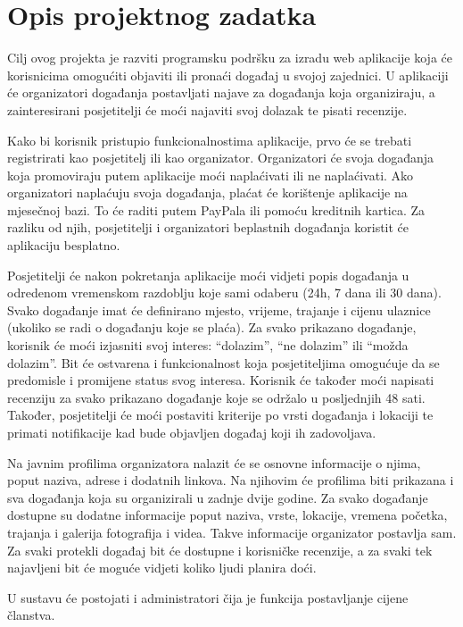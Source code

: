 \chapter{Opis projektnog zadatka}
		
		\large Cilj ovog projekta je razviti programsku podršku za izradu web
aplikacije koja će korisnicima omogućiti objaviti ili pronaći događaj
u svojoj zajednici. U aplikaciji će organizatori događanja postavljati
najave za događanja koja organiziraju, a zainteresirani posjetitelji će
moći najaviti svoj dolazak te pisati recenzije. 

Kako bi korisnik pristupio funkcionalnostima aplikacije, prvo će se trebati registrirati kao posjetitelj ili kao organizator. Organizatori će svoja događanja koja promoviraju putem aplikacije moći naplaćivati ili ne naplaćivati. Ako organizatori naplaćuju svoja događanja, plaćat će korištenje aplikacije na mjesečnoj bazi. To će raditi putem PayPala ili pomoću kreditnih kartica. Za razliku od njih, posjetitelji i organizatori beplastnih događanja koristit će aplikaciju besplatno.

Posjetitelji će nakon pokretanja aplikacije moći vidjeti popis događanja u odredenom vremenskom razdoblju koje sami odaberu (24h, 7 dana ili 30 dana). Svako događanje imat će definirano mjesto, vrijeme, trajanje i cijenu ulaznice (ukoliko se radi o događanju koje se plaća). Za svako prikazano događanje, korisnik će moći izjasniti svoj interes: “dolazim”, “ne dolazim” ili “možda dolazim”. Bit će ostvarena i funkcionalnost koja posjetiteljima omogućuje da se predomisle i promijene status svog interesa. Korisnik će također moći napisati recenziju za svako prikazano događanje koje se održalo u posljednjih 48 sati. Također, posjetitelji će moći postaviti kriterije po vrsti događanja i lokaciji te primati notifikacije kad bude objavljen događaj koji ih zadovoljava.

	Na javnim profilima organizatora nalazit će se osnovne informacije o njima, poput naziva, adrese i dodatnih linkova. Na njihovim će profilima biti prikazana i sva događanja koja su organizirali u zadnje dvije godine. Za svako događanje dostupne su dodatne informacije poput naziva, vrste, lokacije, vremena početka, trajanja i galerija fotografija i videa. Takve informacije organizator postavlja sam. Za svaki protekli događaj bit će dostupne i korisničke recenzije, a za svaki tek najavljeni bit će moguće vidjeti koliko ljudi planira doći.
 
	U sustavu će postojati i administratori čija je funkcija postavljanje cijene članstva.


